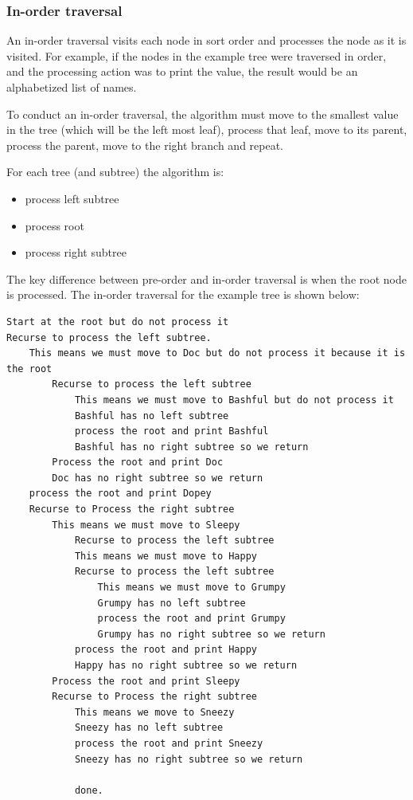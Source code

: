 \subsubsection{In-order traversal}

An in-order traversal visits each node in sort order and processes the
node as it is visited. For example, if the nodes in the example tree
were traversed in order, and the processing action was to print the
value, the result would be an alphabetized list of names.

To conduct an in-order traversal, the algorithm must move to the
smallest value in the tree (which will be the left most leaf), process
that leaf, move to its parent, process the parent, move to the right
branch and repeat.

For each tree (and subtree) the algorithm is:

\begin{itemize}
\item
  process left subtree
\item
  process root
\item
  process right subtree
\end{itemize}

The key difference between pre-order and in-order traversal is when the root node is processed.  The in-order traversal for the example tree  is  shown below:

\begin {lstlisting}
Start at the root but do not process it
Recurse to process the left subtree.
	This means we must move to Doc but do not process it because it is the root
		Recurse to process the left subtree
			This means we must move to Bashful but do not process it
			Bashful has no left subtree
			process the root and print Bashful
			Bashful has no right subtree so we return
		Process the root and print Doc
		Doc has no right subtree so we return
	process the root and print Dopey
	Recurse to Process the right subtree
		This means we must move to Sleepy
			Recurse to process the left subtree
			This means we must move to Happy
			Recurse to process the left subtree
				This means we must move to Grumpy
				Grumpy has no left subtree
				process the root and print Grumpy
				Grumpy has no right subtree so we return
			process the root and print Happy
			Happy has no right subtree so we return
		Process the root and print Sleepy
		Recurse to Process the right subtree
			This means we move to Sneezy
			Sneezy has no left subtree
			process the root and print Sneezy
			Sneezy has no right subtree so we return
			
			done.
\end{lstlisting}




